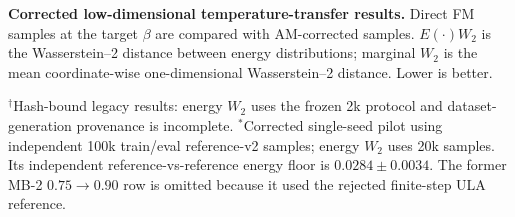 \documentclass[10pt]{article}
\begin{document}
\small
\textbf{Corrected low-dimensional temperature-transfer results.}
Direct FM samples at the target $\beta$ are compared with AM-corrected
samples. $E(\cdot)W_2$ is the Wasserstein--2 distance between energy
distributions; marginal $W_2$ is the mean coordinate-wise one-dimensional
Wasserstein--2 distance. Lower is better.

\vspace{0.9em}
\begin{center}
\end{center}

\vspace{0.45em}
\footnotesize
$^{\dagger}$Hash-bound legacy results: energy $W_2$ uses the frozen 2k
protocol and dataset-generation provenance is incomplete.
$^{*}$Corrected single-seed pilot using independent 100k train/eval
reference-v2 samples; energy $W_2$ uses 20k samples. Its independent
reference-vs-reference energy floor is $0.0284\pm0.0034$.
The former MB-2 $0.75\rightarrow0.90$ row is omitted because it used the
rejected finite-step ULA reference.
\end{document}

